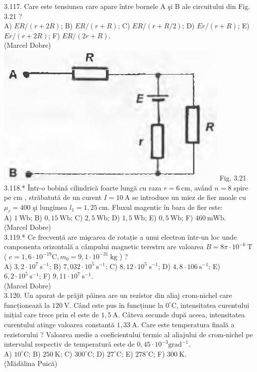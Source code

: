3.117. Care este tensiunea care apare între bornele A şi B ale circuitului din Fig. 3.21 ?\\ A) $E R /(r+2 R)$; B) $E R /(r+R)$; C) $E R /(r+R / 2)$; D) $E r /(r+R)$; E) $E r /(r+2 R)$; F) $E R /(2 r+R)$.\\ (Marcel Dobre)\\ \includegraphics[width=0.4\linewidth]{images/2025_07_01_5b3ff9fa0d508c8e9f17g-169} Fig. 3.21\\

3.118.* Într-o bobinǎ cilindrică foarte lungă cu raza $r=6 \mathrm{~cm}$, având $n=8$ spire pe cm , străbatută de un curent $I=10 \mathrm{~A}$ se introduce un miez de fier moale cu $\mu_{r}=400$ şi lungimea $l_{1}=1,25 \mathrm{~cm}$. Fluxul magentic în bara de fier este:\\ A) $1 \mathrm{~Wb}$; B) $0,15 \mathrm{~Wb}$; C) $2,5 \mathrm{~Wb}$; D) $1,5 \mathrm{~Wb}$; E) $0,5 \mathrm{~Wb}$; F) $460 \mathrm{~mWb}$.\\ (Marcel Dobre)\\

3.119.* Ce frecvență are mişcarea de rotație a unui electron într-un loc unde componenta orizontală a câmpului magnetic terestru are valoarea $B=8 \pi \cdot 10^{-6} \mathrm{~T}$ ( $e=1,6 \cdot 10^{-19} \mathrm{C}, m_{0}=9,1 \cdot 10^{-31} \mathrm{~kg}$ ) ?\\ A) $3,2 \cdot 10^{7} \mathrm{~s}^{-1}$; B) $7,032 \cdot 10^{5} \mathrm{~s}^{-1}$; C) $8,12 \cdot 10^{5} \mathrm{~s}^{-1}$; D) $4,8 \cdot 106 \mathrm{~s}^{-1}$; E) $6,2 \cdot 10^{5} \mathrm{~s}^{-1}$; F) $9,11 \cdot 10^{7} \mathrm{~s}^{-1}$.\\ (Marcel Dobre)\\

3.120. Un aparat de prăjit pâinea are un rezistor din aliaj crom-nichel care funcționează la $120 \mathrm{~V}$. Când este pus în funcțiune la $0^{\circ} \mathrm{C}$, intensitatea curentului inițial care trece prin el este de $1,5 \mathrm{~A}$. Câteva secunde după aceea, intensitatea curentului atinge valoarea constantă $1,33 \mathrm{~A}$. Care este temperatura finală a rezistorului ? Valoarea medie a coeficientului termic al aliajului de crom-nichel pe intervalul respectiv de temperatură este de $0,45 \cdot 10^{-3} \mathrm{grad}^{-1}$.\\ A) $10^{\circ} \mathrm{C}$; B) $250 \mathrm{~K}$; C) $300^{\circ} \mathrm{C}$; D) $27^{\circ} \mathrm{C}$; E) $278^{\circ} \mathrm{C}$; F) $300 \mathrm{~K}$.\\ (Mădălina Puică)\\

